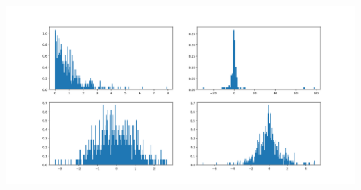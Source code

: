 \documentclass[a4paper,12pt]{article}
\begin{document}


\includegraphics[trim=3cm 0 0 -0.5cm, height = 16 cm, width =  19 cm]{histogramm.png}
\end{document}
